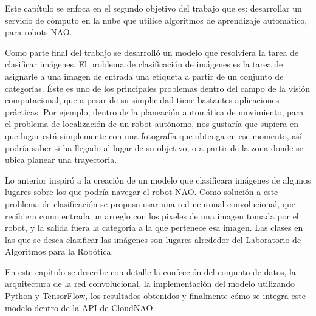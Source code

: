 %
%

Este capítulo se enfoca en el segundo 
objetivo del trabajo que es: desarrollar un 
servicio de cómputo en la nube que utilice 
algoritmos de aprendizaje automático, para 
robots NAO.

Como parte final del trabajo se desarrolló un modelo que resolviera la tarea de clasificar imágenes.
El problema de clasificación de imágenes es la tarea de asignarle a una imagen de
entrada una etiqueta a partir de un conjunto de categorías. Éste es uno de los principales
problemas dentro del campo de la visión computacional, que a pesar de su simplicidad
tiene bastantes aplicaciones prácticas. Por ejemplo, dentro de la planeación automática de movimiento, para el problema de localización de un robot
autónomo, nos gustaría que supiera en que lugar está simplemente con una fotografía
que obtenga en ese momento, así podría saber si ha llegado al lugar de su objetivo, o a partir de la zona donde se ubica planear una trayectoria.

Lo anterior inspiró a la creación de un modelo que clasificara imágenes
de algunos lugares sobre los que podría navegar el robot NAO. 
Como solución a este problema de clasificación se propuso usar 
una red neuronal convolucional, que recibiera como entrada un arreglo con los
pixeles de una imagen tomada por el robot, y la salida fuera la categoría
a la que pertenece esa imagen. 
Las clases en las que se desea clasificar las imágenes son lugares alrededor
del Laboratorio de Algoritmos para la Robótica.

En este capítulo se describe con detalle la confección del conjunto de datos, la arquitectura de la red 
convolucional, la implementación
del modelo utilizando Python y TensorFlow, los resultados obtenidos
y finalmente cómo se integra este modelo dentro de la API de CloudNAO. 

%
%
